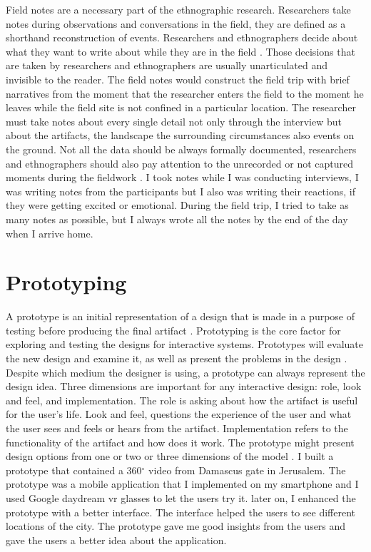 Field notes are a necessary part of the ethnographic research. Researchers take notes during observations and conversations in the field, they are defined as a shorthand reconstruction of events. Researchers and ethnographers decide about what they want to write about while they are in the field \citep{Wolfinger2002OnExpectancies}. Those decisions that are taken by researchers and ethnographers are usually unarticulated and invisible to the reader. The field notes would construct the field trip with brief narratives from the moment that the researcher enters the field to the moment he leaves while the field site is not confined in a particular location. The researcher must take notes about every single detail not only through the interview but about the artifacts, the landscape the surrounding circumstances also events on the ground. Not all the data should be always formally documented, researchers and ethnographers should also pay attention to the unrecorded or not captured moments during the fieldwork \citep{Boulus-rdje2018StuckSite}. I took notes while I was conducting interviews, I was writing notes from the participants but I also was writing their reactions, if they were getting excited or emotional. During the field trip, I tried to take as many notes as possible, but I always wrote all the notes by the end of the day when I arrive home.   

\section{Prototyping}

A prototype is an initial representation of a design that is made in a purpose of testing before producing the final artifact \citep{Buchenau2000ExperiencePrototyping}. Prototyping is the core factor for exploring and testing the designs for interactive systems. Prototypes will evaluate the new design and examine it, as well as present the problems in the design \citep{Buchenau2000ExperiencePrototyping, Houde1997WhatPrototype}. Despite which medium the designer is using, a prototype can always represent the design idea. Three dimensions are important for any interactive design: role, look and feel, and implementation. The role is asking about how the artifact is useful for the user's life. Look and feel, questions the experience of the user and what the user sees and feels or hears from the artifact. Implementation refers to the functionality of the artifact and how does it work. The prototype might present design options from one or two or three dimensions of the model \citep{Houde1997WhatPrototype, Buchenau2000ExperiencePrototyping}. I built a prototype that contained a 360$^{\circ}$ video from Damascus gate in Jerusalem. The prototype was a mobile application that I implemented on my smartphone and I used Google daydream \acrshort{vr} glasses to let the users try it. later on, I enhanced the prototype with a better interface. The interface helped the users to see different locations of the city. The prototype gave me good insights from the users and gave the users a better idea about the application.

